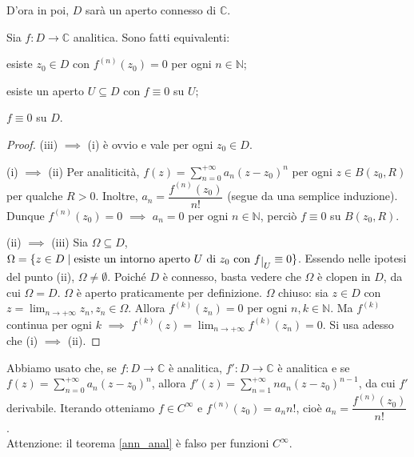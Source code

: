 D'ora in poi, $D$ sarà un aperto connesso di $\mathbb{C}$.

\begin{thm} \label{ann_anal}
  Sia $f:D \longrightarrow \mathbb{C}$ analitica. Sono fatti equivalenti:
  \begin{nlist}
    \item esiste $z_0 \in D$ con $f^{(n)}(z_0)=0$ per ogni $n \in \mathbb{N}$;
    \item esiste un aperto $U \subseteq D$ con $f \equiv 0$ su $U$;
    \item $f \equiv 0$ su $D$.
  \end{nlist}
\end{thm}

\begin{proof}
  (iii) $\implies$ (i) è ovvio e vale per ogni $z_0 \in D$.

  (i) $\implies$ (ii) Per analiticità, $\displaystyle f(z)=\sum_{n=0}^{+\infty} a_n(z-z_0)^n$ per ogni $z \in B(z_0, R)$ per qualche $R>0$. Inoltre, $a_n=\dfrac{f^{(n)}(z_0)}{n!}$ (segue da una semplice induzione). Dunque $f^{(n)}(z_0)=0$ $\implies$ $a_n=0$ per ogni $n \in \mathbb{N}$, perciò $f \equiv 0$ su $B(z_0, R)$.

  (ii) $\implies$ (iii) Sia $\Omega \subseteq D$, $\Omega=\{z \in D \mid \text{esiste un intorno aperto } U \text{ di } z_0 \text{ con } f\restrict{U}\equiv 0\}$. Essendo nelle ipotesi del punto (ii), $\Omega \not=\emptyset$. Poiché $D$ è connesso, basta vedere che $\Omega$ è clopen in $D$, da cui $\Omega=D$. $\Omega$ è aperto praticamente per definizione.
  $\Omega$ chiuso: sia $z \in D$ con $\displaystyle z=\lim_{n \longrightarrow +\infty} z_n, z_n \in \Omega$. Allora $f^{(k)}(z_n)=0$ per ogni $n, k \in \mathbb{N}$. Ma $f^{(k)}$ continua per ogni $k$ $\implies$ $\displaystyle f^{(k)}(z)=\lim_{n \longrightarrow +\infty} f^{(k)}(z_n)=0$. Si usa adesso che (i) $\implies$ (ii).
\end{proof}

Abbiamo usato che, se $f:D \longrightarrow \mathbb{C}$ è analitica, $f':D \longrightarrow \mathbb{C}$ è analitica e se $\displaystyle f(z)=\sum_{n=0}^{+\infty} a_n(z-z_0)^n$, allora $\displaystyle f'(z)=\sum_{n=1}^{+\infty} na_n(z-z_0)^{n-1}$, da cui $f'$ derivabile. Iterando otteniamo $f \in C^{\infty}$ e $f^{(n)}(z_0)=a_nn!$, cioè $a_n=\dfrac{f^{(n)}(z_0)}{n!}$. \\

Attenzione: il teorema \ref{ann_anal} è falso per funzioni $C^{\infty}$. \marginpar\warningsign

